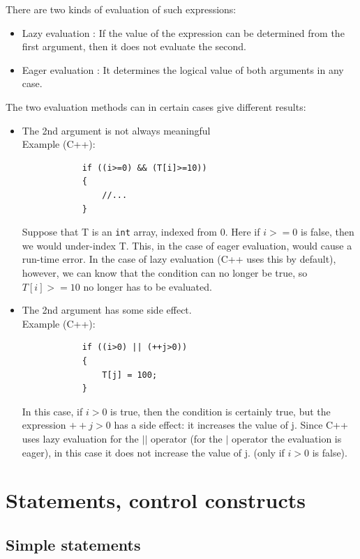 \documentclass[margin=0px]{article}
\begin{document}
\noindent There are two kinds of evaluation of such expressions:
\begin{itemize}
    \item	Lazy evaluation : If the value of the expression can be determined from the first argument, then it does
          not evaluate the second.
    \item	Eager evaluation : It determines the logical value of both arguments in any case.
\end{itemize}

\noindent The two evaluation methods can in certain cases give different results:
\begin{itemize}
    \item	The 2nd argument is not always meaningful\\
          Example (C++):
          \begin{verbatim}
            if ((i>=0) && (T[i]>=10))
            {
                //...
            }
            \end{verbatim}
          Suppose that T is an \texttt{int} array, indexed from 0.
          Here if $i>=0$ is false, then we would under-index T. This, in the case of eager evaluation, would cause a run-time error.
          In the case of lazy evaluation (C++ uses this by default), however, we can know that the condition can no longer be true, so $T[i]>=10$ no longer	has to be evaluated.
    \item	The 2nd argument has some side effect.\\
          Example (C++):
          \begin{verbatim}
            if ((i>0) || (++j>0))
            {
                T[j] = 100;
            }
            \end{verbatim}
          In this case, if $i>0$ is true, then the condition is certainly true, but the expression $++j>0$ has a side effect: it increases the value of j.
          Since C++ uses lazy evaluation for the $||$ operator (for the $|$ operator the evaluation is eager), in this case it does not increase the value of j. (only if $i>0$ is false).
\end{itemize}

\section{Statements, control constructs}

\subsection{Simple statements}
\end{document}
